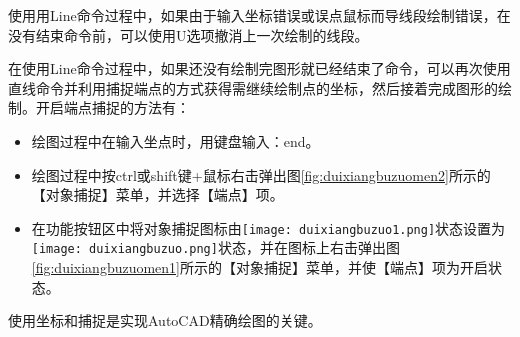 \begin{tips}
\item 使用用Line命令过程中，如果由于输入坐标错误或误点鼠标而导线段绘制错误，在没有结束命令前，可以使用U选项撤消上一次绘制的线段。
\item 在使用Line命令过程中，如果还没有绘制完图形就已经结束了命令，可以再次使用直线命令并利用捕捉端点的方式获得需继续绘制点的坐标，然后接着完成图形的绘制。开启端点捕捉的方法有：
\begin{itemize}
\item 绘图过程中在输入坐点时，用键盘输入：end。
\item 绘图过程中按ctrl或shift键+鼠标右击弹出图\ref{fig:duixiangbuzuomen2}所示的【对象捕捉】菜单，并选择【端点】项。
\item 在功能按钮区中将对象捕捉图标由\texttt{[image: duixiangbuzuo1.png]}状态设置为\texttt{[image: duixiangbuzuo.png]}状态，并在图标上右击弹出图\ref{fig:duixiangbuzuomen1}所示的【对象捕捉】菜单，并使【端点】项为开启状态。
\end{itemize}
\item 使用坐标和捕捉是实现AutoCAD精确绘图的关键。
\end{tips}
\begin{figure}[htbp]
\centering
\begin{floatrow}
\end{floatrow}
\end{figure}

